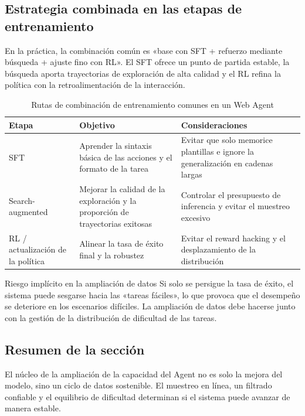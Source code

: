 \subsection{Estrategia combinada en las etapas de entrenamiento}
En la práctica, la combinación común es «base con SFT + refuerzo mediante búsqueda + ajuste fino con RL». El SFT ofrece un punto de partida estable, la búsqueda aporta trayectorias de exploración de alta calidad y el RL refina la política con la retroalimentación de la interacción.

\begin{table}[H]
\centering
\small
\begin{tabular}{p{2.4cm}p{3.9cm}p{4.7cm}}
\toprule
\textbf{Etapa} & \textbf{Objetivo} & \textbf{Consideraciones} \\
\midrule
SFT & Aprender la sintaxis básica de las acciones y el formato de la tarea & Evitar que solo memorice plantillas e ignore la generalización en cadenas largas \\
Search-augmented & Mejorar la calidad de la exploración y la proporción de trayectorias exitosas & Controlar el presupuesto de inferencia y evitar el muestreo excesivo \\
RL / actualización de la política & Alinear la tasa de éxito final y la robustez & Evitar el reward hacking y el desplazamiento de la distribución \\
\bottomrule
\end{tabular}
\caption{Rutas de combinación de entrenamiento comunes en un Web Agent}
\end{table}

\begin{warningbox}{Riesgo implícito en la ampliación de datos}
Si solo se persigue la tasa de éxito, el sistema puede sesgarse hacia las «tareas fáciles», lo que provoca que el desempeño se deteriore en los escenarios difíciles. La ampliación de datos debe hacerse junto con la gestión de la distribución de dificultad de las tareas.
\end{warningbox}

\subsection{Resumen de la sección}
El núcleo de la ampliación de la capacidad del Agent no es solo la mejora del modelo, sino un ciclo de datos sostenible. El muestreo en línea, un filtrado confiable y el equilibrio de dificultad determinan si el sistema puede avanzar de manera estable.

